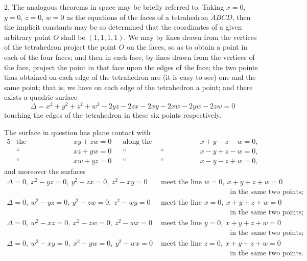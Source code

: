 \documentclass[11pt,a4paper]{article}
\begin{document}
2. The analogous theorems in space may be briefly referred to. Taking $x=0$,
$y=0$, $z=0$, $w=0$ as the equations of the faces of a tetrahedron $ABCD$, then the
implicit constants may be so determined that the coordinates of a given arbitrary point
$O$ shall be $(1, 1, 1, 1)$. We may by lines drawn from the vertices of the tetrahedron
project the point $O$ on the faces, so as to obtain a point in each of the four faces;
and then in each face, by lines drawn from the vertices of the face, project the point
in that face upon the edges of the face; the two points thus obtained on each edge
of the tetrahedron are (it is easy to see) one and the same point; that is, we have
on each edge of the tetrahedron a point; and there exists a quadric surface
\[
\Delta = x^2 + y^2 + z^2 + w^2 - 2yz - 2zx - 2xy - 2xw - 2yw - 2zw = 0
\]
touching the edges of the tetrahedron in these six points respectively.

The surface in question has plane contact with
\begin{alignat*}{5}
&\text{the hyperboloid } &&xy+zw=0 &&\text{along the intersection with } &&x+y-z-w=0,\\
&\text{``}\qquad\;\;\; &&xz+yw=0 &&\text{``}\qquad\qquad\;\;\;\text{``} &&x-y+z-w=0,\\
&\text{``}\qquad\;\;\; &&xw+yz=0 &&\text{``}\qquad\qquad\;\;\;\text{``} &&x-y-z+w=0,
\end{alignat*}
and moreover the surfaces
\begin{align*}
\Delta=0,\ x^2-yz=0,\ y^2-zx=0,\ z^2-xy=0 &\text{ meet the line } w=0,\ x+y+z+w=0\\
&\qquad\qquad\qquad\qquad\qquad\text{in the same two points};\\
\Delta=0,\ w^2-yz=0,\ y^2-zw=0,\ z^2-wy=0 &\text{ meet the line } x=0,\ x+y+z+w=0\\
&\qquad\qquad\qquad\qquad\qquad\text{in the same two points};\\
\Delta=0,\ w^2-xz=0,\ x^2-zw=0,\ z^2-wx=0 &\text{ meet the line } y=0,\ x+y+z+w=0\\
&\qquad\qquad\qquad\qquad\qquad\text{in the same two points};\\
\Delta=0,\ w^2-xy=0,\ x^2-yw=0,\ y^2-wx=0 &\text{ meet the line } z=0,\ x+y+z+w=0\\
&\qquad\qquad\qquad\qquad\qquad\text{in the same two points}.
\end{align*}
\end{document}
